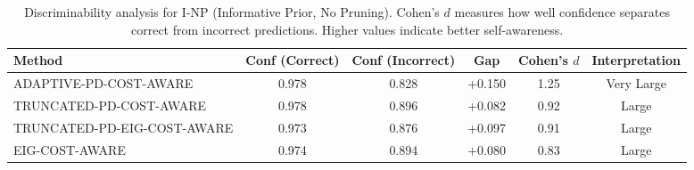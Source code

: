 \begin{table}[htbp]
\centering
\small
\caption{Discriminability analysis for I-NP (Informative Prior, No Pruning). Cohen's $d$ measures how well confidence separates correct from incorrect predictions. Higher values indicate better self-awareness.}
\label{tab:discriminability-notprune_notuniform}
\begin{tabular}{@{}lccccc@{}}
\toprule
Method & Conf (Correct) & Conf (Incorrect) & Gap & Cohen's $d$ & Interpretation \\
\midrule
ADAPTIVE-PD-COST-AWARE & 0.978 & 0.828 & +0.150 & 1.25 & Very Large \\
TRUNCATED-PD-COST-AWARE & 0.978 & 0.896 & +0.082 & 0.92 & Large \\
TRUNCATED-PD-EIG-COST-AWARE & 0.973 & 0.876 & +0.097 & 0.91 & Large \\
EIG-COST-AWARE & 0.974 & 0.894 & +0.080 & 0.83 & Large \\
\bottomrule
\end{tabular}
\end{table}